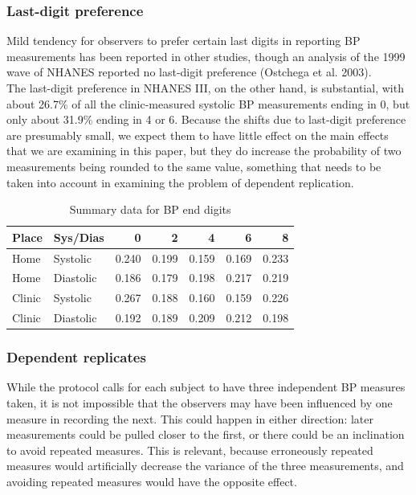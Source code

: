 \documentclass[
]{article}
\begin{document}
\hypertarget{sec:lastdigit}{%
\subsubsection{Last-digit preference}\label{sec:lastdigit}}

Mild tendency for observers to prefer certain last digits in reporting BP measurements has been reported in other studies, though an analysis of the 1999 wave of NHANES reported no last-digit preference (Ostchega et al. 2003).\\
The last-digit preference in NHANES III, on the other hand, is substantial, with about 26.7\% of all the clinic-measured systolic BP measurements ending in 0, but only about 31.9\% ending in 4 or 6. Because the shifts due to last-digit preference are presumably small, we expect them to have little effect on the main effects that we are examining in this paper, but they do increase the probability of two measurements being rounded to the same value, something that needs to be taken into account in examining the problem of dependent replication.

\begin{table}[!h]

\caption{\label{tab:digit-summary}Summary data for BP end digits}
\centering
\begin{tabular}[t]{llrrrrr}
\toprule
Place & Sys/Dias & 0 & 2 & 4 & 6 & 8\\
\midrule
Home & Systolic & 0.240 & 0.199 & 0.159 & 0.169 & 0.233\\
Home & Diastolic & 0.186 & 0.179 & 0.198 & 0.217 & 0.219\\
Clinic & Systolic & 0.267 & 0.188 & 0.160 & 0.159 & 0.226\\
Clinic & Diastolic & 0.192 & 0.189 & 0.209 & 0.212 & 0.198\\
\bottomrule
\end{tabular}
\end{table}

\hypertarget{sec:pseudorep}{%
\subsubsection{Dependent replicates}\label{sec:pseudorep}}

While the protocol calls for each subject to have three independent BP measures taken, it is not impossible that the observers may have been influenced by one measure in recording the next.
This could happen in either direction: later measurements could be pulled closer to the first, or there could be an inclination to avoid repeated measures.
This is relevant, because erroneously repeated measures would artificially decrease the variance of the three measurements, and avoiding repeated measures would have the opposite effect.
\end{document}
